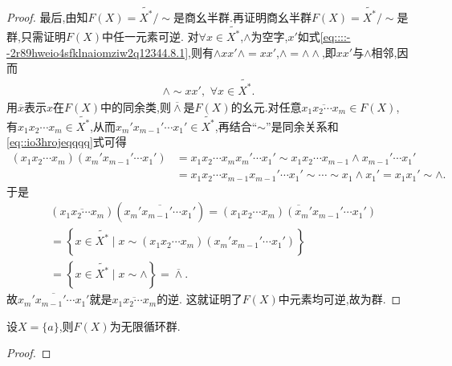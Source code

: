 \documentclass[../../main.tex]{subfiles}%
\begin{document}
\begin{proof}
最后,由知$F(X)=\widetilde{X^*}/\sim$是商幺半群.再证明商幺半群$F(X)=\widetilde{X^*}/\sim$是群,只需证明$F(X)$中任一元素可逆. 对$\forall x\in \widetilde{X^*}$,$\land$为空字,$x'$如式\eqref{eq::::--2r89hweio4sfklnaiomziw2q12344.8.1},则有$\land xx'\land=xx'$,$\land=\land\land$,即$xx'$与$\land$相邻,因而
\begin{align}\label{eq::io3hrojeqqqq}
\land\sim xx',\,\,\forall x\in \widetilde{X^*}.
\end{align}
用$\overline{x}$表示$x$在$F(X)$中的同余类,则$\overline{\land}$是$F(X)$的幺元.对任意$\overline{x_1x_2\cdots x_m}\in F\left( X \right)$,
有$x_1x_2\cdots x_m\in \widetilde{X^*}$,从而$x_m' x_{m-1}' \cdots x_1'\in \widetilde{X^*}$,再结合“$\sim$”是同余关系和\eqref{eq::io3hrojeqqqq}式可得
\begin{align*}
(x_1x_2\cdots x_m)(x_m' x_{m-1}' \cdots x_1' )&=x_1x_2\cdots x_mx_m' \cdots x_1' \sim x_1x_2\cdots x_{m-1}\land x_{m-1}' \cdots x_1' \\
&=x_1x_2\cdots x_{m-1}x_{m-1}' \cdots x_1' \sim \cdots \sim x_1\land x_1' =x_1x_1' \sim \land.
\end{align*}
于是
\begin{align*}
&\left( \overline{x_1x_2\cdots x_m} \right) \left( \overline{x_m' x_{m-1}' \cdots x_1' } \right) =\overline{\left( x_1x_2\cdots x_m \right) \left( x_m' x_{m-1}' \cdots x_1' \right) }
\\
&=\left\{ x\in \widetilde{X^*}\mid x\sim \left( x_1x_2\cdots x_m \right) \left( x_m' x_{m-1}' \cdots x_1' \right) \right\} 
\\
&=\left\{ x\in \widetilde{X^*}\mid x\sim \land \right\} =\overline{\land }.
\end{align*}
故$\overline{x_m' x_{m-1}' \cdots x_1' }$就是$\overline{x_1x_2\cdots x_m}$的逆.
这就证明了$F(X)$中元素均可逆,故为群.

\end{proof}


\begin{proposition}\label{proposition:单元素集的自由群必是无限循环群}
设$X=\{a\}$,则$F(X)$为无限循环群.
\end{proposition}
\begin{proof}

\end{proof}
\end{document}
